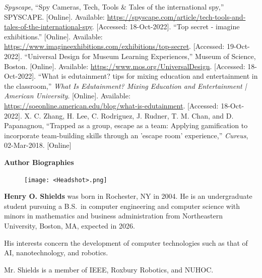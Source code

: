 \documentclass[conference]{IEEEtran}
\begin{document}
\begin{thebibliography}{00}
 \textit{Spyscape}, “Spy Cameras, Tech, Tools & Tales of the international spy,” SPYSCAPE. [Online]. Available: \href{https://spyscape.com/article/tech-tools-and-tales-of-the-international-spy}{https://spyscape.com/article/tech-tools-and-tales-of-the-international-spy}. [Accessed: 18-Oct-2022].
 “Top secret - imagine exhibitions.” [Online]. Available: \href{https://www.imagineexhibitions.com/exhibitions/top-secret}{https://www.imagineexhibitions.com/exhibitions/top-secret}. [Accessed: 19-Oct-2022].
 “Universal Design for Museum Learning Experiences,” Museum of Science, Boston.  [Online]. Available: \href{https://www.mos.org/UniversalDesign}{https://www.mos.org/UniversalDesign}. [Accessed: 18-Oct-2022].
 “What is edutainment? tips for mixing education and entertainment in the classroom,” \textit{What Is Edutainment? Mixing Education and Entertainment | American University}. [Online]. Available: \href{https://soeonline.american.edu/blog/what-is-edutainment}{https://soeonline.american.edu/blog/what-is-edutainment}. [Accessed: 18-Oct-2022]. 
 X. C. Zhang, H. Lee, C. Rodriguez, J. Rudner, T. M. Chan, and D. Papanagnou, “Trapped as a group, escape as a team: Applying gamification to incorporate team-building skills through an 'escape room' experience,” \textit{Cureus}, 02-Mar-2018. [Online]
\end{thebibliography}

\twocolumn


  \LARGE \textbf{Author Biographies}  

  \vspace{15pt} \normalsize


  \begin{figure}
    \texttt{[image: <Headshot>.png]}
  \end{figure}
  \par \textbf{Henry O. Shields} was born in Rochester, NY in 2004. He is an undergraduate student pursuing a B.S.\ in computer engineering and computer science with minors in mathematics and business administration from Northeastern University, Boston, MA, expected in 2026.
\par His interests concern the development of computer technologies such as that of AI, nanotechnology, and robotics.
\par Mr. Shields is a member of IEEE, Roxbury Robotics, and NUHOC.
\end{document}
